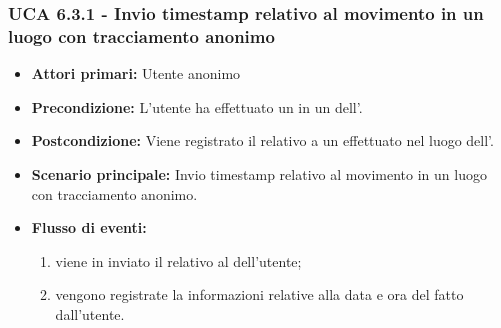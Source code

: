 \subsubsection{UCA 6.3.1 - Invio timestamp relativo al movimento in un luogo con tracciamento anonimo}
\begin{itemize}
	\item \textbf{Attori primari:} Utente anonimo
	\item \textbf{Precondizione:} L'utente ha effettuato un  in un  dell'.
	\item \textbf{Postcondizione:} Viene registrato il  relativo a un  effettuato nel luogo dell'.
	\item \textbf{Scenario principale:} Invio timestamp relativo al movimento in un luogo con tracciamento anonimo.
	\item \textbf{Flusso di eventi:}
	\begin{enumerate}
		\item viene in inviato il  relativo al  dell'utente;
		\item vengono registrate la informazioni relative alla data e ora del  fatto dall'utente.
	\end{enumerate}
\end{itemize}


